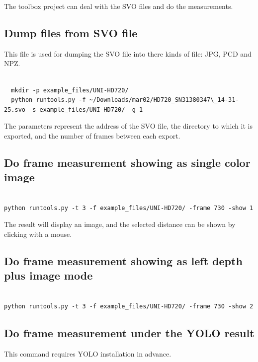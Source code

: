 The toolbox project can deal with the SVO files and do the measurements. 

\subsection{Dump files from SVO file}

This file is used for dumping the SVO file into there kinds of file: JPG, PCD and NPZ.

\begin{lstlisting}

  mkdir -p example_files/UNI-HD720/
  python runtools.py -f ~/Downloads/mar02/HD720_SN31380347\_14-31-25.svo -s example_files/UNI-HD720/ -g 1

\end{lstlisting}

The parameters represent the address of the SVO file, the directory to which it is exported, and the number of frames between each export.

\subsection{Do frame measurement showing as single color image}

\begin{lstlisting}

python runtools.py -t 3 -f example_files/UNI-HD720/ -frame 730 -show 1

\end{lstlisting}

The result will display an image, and the selected distance can be shown by clicking with a mouse. 

\subsection{Do frame measurement showing as left depth plus image mode}

\begin{lstlisting}

python runtools.py -t 3 -f example_files/UNI-HD720/ -frame 730 -show 2

\end{lstlisting}

\subsection{Do frame measurement under the YOLO result}

This command requires YOLO installation in advance.

